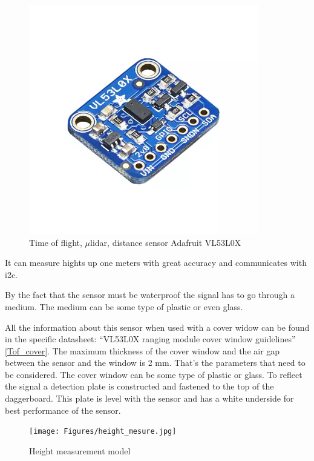 \begin{figure}[H]
	\centering %
	\includegraphics[width = 10cm]{Figures/Adafruit_height_sensor.png}
	\caption{Time of flight, $\mu$\gls{lidar}, distance sensor Adafruit VL53L0X}
	\label{micro_lidar}
\end{figure}

It can measure hights up one meters with great accuracy and communicates with \gls{i2c}.

By the fact that the sensor must be waterproof the signal has to go through a medium. The medium can be some type of plastic or even glass.   

All the information about this sensor when used with a cover widow can be found in the specific datasheet: “VL53L0X ranging module cover window guidelines” \ref{Tof_cover}. The maximum thickness of the cover window and the air gap between the sensor and the window is 2 mm. That’s the parameters that need to be considered. The cover window can be some type of plastic or glass. To reflect the signal a detection plate is constructed and fastened to the top of the daggerboard. This plate is level with the sensor and has a white underside for best performance of the sensor. 

\begin{figure}[H]
	\centering %
	\texttt{[image: Figures/height\_mesure.jpg]}
	\caption{Height measurement model}
	\label{height_measure}
\end{figure}


